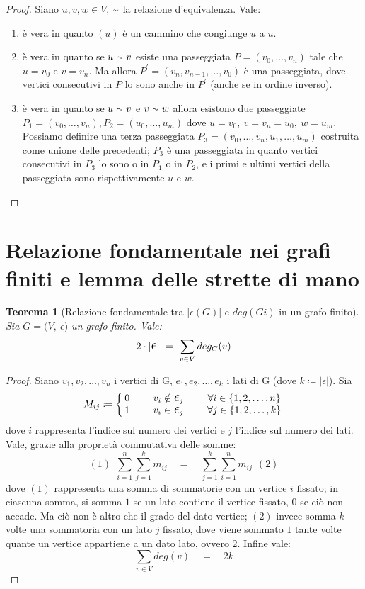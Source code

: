 \documentclass[12pt,twoside]{article}
\newcommand{\pr}{\prime}
\newcommand{\Eps}{${\Large$\epsilon$}$}
\newcommand{\grafo}{(V, \: \Eps)}
\newcommand{\til}{\raise.17ex\hbox{$\scriptstyle\mathtt{\sim}$}}
\newtheorem{theorem}{Teorema}
\begin{document}
\begin{proof}
Siano $u, v, w \in V$, $\til$ la relazione d'equivalenza. Vale:
\begin{enumerate}
\item è vera in quanto $(u)$ è un cammino che congiunge $u$ a $u$.
\item è vera in quanto se $u\ \til\ v$ esiste una passeggiata $P = (v_0,\ldots, v_n)$ tale che $u = v_0$ e $v = v_n$. Ma allora $P^{\pr} = (v_n, v_{n-1},\ldots ,v_0)$ è una passeggiata, dove vertici consecutivi in $P$ lo sono anche in $P^{\pr}$ (anche se in ordine inverso).
\item è vera in quanto se $u\ \til\ v$ e $v\ \til\ w$ allora esistono due passeggiate $P_1 = (v_0,\ldots ,v_n), P_2 = (u_0,\ldots, u_m)$ dove $u = v_0,\ v = v_n = u_0,\ w = u_m$. Possiamo definire una terza passeggiata $P_3 = (v_0,\ldots ,v_n,u_1,\ldots ,u_m)$ costruita come unione delle precedenti; $P_3$ è una passeggiata in quanto vertici consecutivi in $P_3$ lo sono o in $P_1$ o in $P_2$, e i primi e ultimi vertici della passeggiata sono rispettivamente $u$ e $w$.
\end{enumerate}
\end{proof}

\section{Relazione fondamentale nei grafi finiti e lemma delle strette di mano}
\begin{theorem}[Relazione fondamentale tra $|\Eps(G)|$ e $deg(Gi)$ in un grafo finito]
Sia $G = \grafo$ un grafo finito. Vale:
$$ 2 \cdot | \mathlarger{\mathlarger{\epsilon}} | \ = \ \sum_{v\in V} deg_G (v) $$
\end{theorem}

\begin{proof}
Siano $v_1, v_2,\ldots ,v_n$ i vertici di G, $e_1, e_2,\ldots, e_k$ i lati di G (dove $k \coloneqq | \Eps |$). Sia
\[
M_{ij} \coloneqq \left\{
\setlength\arraycolsep{2pt}
\begin{array}{ccc} 0 &\qquad v_i \notin \ \Eps_j &\qquad \forall i \in \{1, 2, \ldots , n\} \\ \relax
1 &\qquad v_i \in \ \Eps_j &\qquad \forall j \in \{1, 2, \ldots ,k \} 
\end{array}\right
.
\]
dove $i$ rappresenta l'indice sul numero dei vertici e $j$ l'indice sul numero dei lati. Vale, grazie alla proprietà commutativa delle somme:
$$ (1)\ \ \sum_{i=1}^n \sum_{j=1}^k m_{ij} \quad = \quad \sum_{j=1}^k\sum_{i=1}^n m_{ij}\ \ (2)$$
dove $(1)$ rappresenta una somma di sommatorie con un vertice $i$ fissato; in ciascuna somma, si somma $1$ se un lato contiene il vertice fissato, $0$ se ciò non accade. Ma ciò non è altro che il grado del dato vertice; $(2)$ invece somma $k$ volte una sommatoria con un lato $j$ fissato, dove viene sommato $1$ tante volte quante un vertice appartiene a un dato lato, ovvero 2. Infine vale:
$$ \sum_{v\in V} deg(v) \quad = \quad 2k$$
\end{proof}
\end{document}
